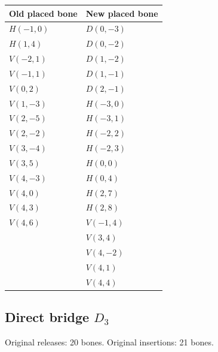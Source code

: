 \documentclass[
  11pt,
]{article}
\begin{document}
\begin{longtable}[]{@{}ll@{}}
\toprule\noalign{}
Old placed bone & New placed bone \\
\midrule\noalign{}
\endhead
\bottomrule\noalign{}
\endlastfoot
\(H(-1,0)\) & \(D(0,-3)\) \\
\(H(1,4)\) & \(D(0,-2)\) \\
\(V(-2,1)\) & \(D(1,-2)\) \\
\(V(-1,1)\) & \(D(1,-1)\) \\
\(V(0,2)\) & \(D(2,-1)\) \\
\(V(1,-3)\) & \(H(-3,0)\) \\
\(V(2,-5)\) & \(H(-3,1)\) \\
\(V(2,-2)\) & \(H(-2,2)\) \\
\(V(3,-4)\) & \(H(-2,3)\) \\
\(V(3,5)\) & \(H(0,0)\) \\
\(V(4,-3)\) & \(H(0,4)\) \\
\(V(4,0)\) & \(H(2,7)\) \\
\(V(4,3)\) & \(H(2,8)\) \\
\(V(4,6)\) & \(V(-1,4)\) \\
& \(V(3,4)\) \\
& \(V(4,-2)\) \\
& \(V(4,1)\) \\
& \(V(4,4)\) \\
\end{longtable}


\subsection{\texorpdfstring{Direct bridge
\(D_3\)}{Direct bridge D\_3}}\label{direct-bridge-d_3}

Original releases: 20 bones. Original insertions: 21 bones.
\end{document}
